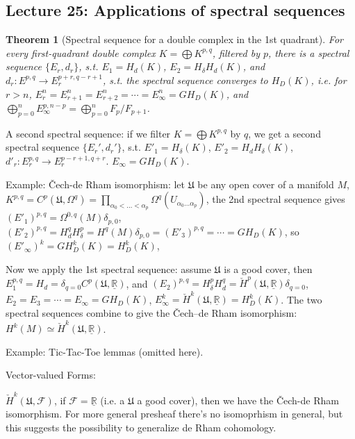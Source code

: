 \documentclass{article}
\theoremstyle{mystyle}
\newtheorem*{theorem*}{Theorem}
\theoremstyle{remark}
\numberwithin{equation}{section}
\begin{document}
\subsection{Lecture 25: Applications of spectral sequences}

\begin{theorem*}[Spectral sequence for a double complex in the 1st quadrant] For every first-quadrant double complex $K = \bigoplus K^{p,q}$, filtered by $p$, there is a spectral sequence $\{E_r,d_r\}$, s.t. $E_1 = H_d(K)$, $E_2 = H_\delta H_d(K)$, and $d_r\colon E^{p,q}\rightarrow E^{p+r,q-r+1}_r$, s.t. the spectral sequence converges to $H_D(K)$, i.e. for $r>n$, $E_r^n = E_{r+1}^n=E_{r+2}^n=\cdots = E_\infty^n = GH_D(K)$, and $\bigoplus_{p=0}^nE^{p,n-p}_\infty = \bigoplus_{p=0}^n F_p/F_{p+1}$. 
\end{theorem*}

A second spectral sequence: if we filter $K = \bigoplus K^{p,q}$ by $q$, we get a second spectral sequence $\{E_r',d_r'\}$, s.t. $E'_1 = H_\delta(K)$, $E'_2 = H_dH_\delta(K)$, $d'_r\colon E^{p,q}_r\rightarrow E_r^{p-r+1,q+r}$. $E_\infty = GH_D(K)$.

Example: Čech-de Rham isomorphism: let $\mathfrak{U}$ be any open cover of a manifold $M$, $K^{p,q} = C^p(\mathfrak{U},\Omega^q) = \prod_{\alpha_0<...<\alpha_p} \Omega^q(U_{\alpha_0...\alpha_p})$, the 2nd spectral sequence gives
$(E'_1)^{p,q} = \Omega^{0,q}(M)\delta_{p,0}$, $(E'_2)^{p,q} = H_d^qH_\delta^p = H^q(M) \delta_{p,0} = (E'_3)^{p,q}=\cdots = GH_D(K)$, so $(E'_\infty)^k = GH^k_D(K) = H^k_D(K)$, 

Now we apply the 1st spectral sequence: assume $\mathfrak{U}$ is a good cover, then $E^{p,q}_1 = H_d = \delta_{q=0} C^p(\mathfrak{U},\underline{\mathbb{R}})$, and $(E_2)^{p,q} = H^p_\delta H^q_d = \check{H}^p(\mathfrak{U},\underline{\mathbb{R}})\delta_{q=0}$, $E_2=E_3=\cdots = E_\infty =GH_D(K)$, $E_\infty^k = \check{H}^k(\mathfrak{U},\underline{\mathbb{R}}) = H^k_D(K)$. The two spectral sequences combine to give the Čech--de Rham isomorphism: $H^k(M) \simeq \check{H}^k(\mathfrak{U},\underline{\mathbb{R}})$. 

Example: Tic-Tac-Toe lemmas (omitted here).

Vector-valued Forms:

$\check{H}^k(\mathfrak{U},\mathcal{F})$, if $\mathcal{F} = \underline{\mathbb{R}}$ (i.e. a $\mathfrak{U}$ a good cover), then we have the Čech-de Rham isomorphism. For more general presheaf there's no isomoprhism in general, but this suggests the possibility to generalize de Rham cohomology.
\end{document}
